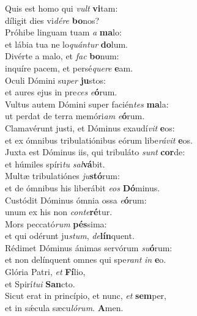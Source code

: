 \evenverse Quis est homo qui \textit{vult} \textbf{vi}tam:~\*\\
\evenverse díligit dies vi\textit{dé}\textit{re} \textbf{bo}nos?\\
\oddverse Próhibe linguam tuam \textit{a} \textbf{ma}lo:~\*\\
\oddverse et lábia tua ne lo\textit{quán}\textit{tur} \textbf{do}lum.\\
\evenverse Divérte a malo, et \textit{fac} \textbf{bo}num:~\*\\
\evenverse inquíre pacem, et persé\textit{que}\textit{re} \textbf{e}am.\\
\oddverse Oculi Dómini su\textit{per} \textbf{ju}stos:~\*\\
\oddverse et aures ejus in pre\textit{ces} \textit{e}\textbf{ó}rum.\\
\evenverse Vultus autem Dómini super facién\textit{tes} \textbf{ma}la:~\*\\
\evenverse ut perdat de terra memóri\textit{am} \textit{e}\textbf{ó}rum.\\
\oddverse Clamavérunt justi, et Dóminus exaudí\textit{vit} \textbf{e}os:~\*\\
\oddverse et ex ómnibus tribulatiónibus eórum libe\textit{rá}\textit{vit} \textbf{e}os.\\
\evenverse Juxta est Dóminus iis, qui tribuláto \textit{sunt} \textbf{cor}de:~\*\\
\evenverse et húmiles spíri\textit{tu} \textit{sal}\textbf{vá}bit.\\
\oddverse Multæ tribulatiónes \textit{ju}\textbf{stó}rum:~\*\\
\oddverse et de ómnibus his liberábit \textit{e}\textit{os} \textbf{Dó}minus.\\
\evenverse Custódit Dóminus ómnia ossa \textit{e}\textbf{ó}rum:~\*\\
\evenverse unum ex his non \textit{con}\textit{te}\textbf{ré}tur.\\
\oddverse Mors peccató\textit{rum} \textbf{pés}sima:~\*\\
\oddverse et qui odérunt ju\textit{stum}, \textit{de}\textbf{lín}quent.\\
\evenverse Rédimet Dóminus ánimas servórum \textit{su}\textbf{ó}rum:~\*\\
\evenverse et non delínquent omnes qui spe\textit{rant} \textit{in} \textbf{e}o.\\
\oddverse Glória Patri, \textit{et} \textbf{Fí}lio,~\*\\
\oddverse et Spirí\textit{tu}\textit{i} \textbf{San}cto.\\
\evenverse Sicut erat in princípio, et nunc, \textit{et} \textbf{sem}per,~\*\\
\evenverse et in sǽcula sæcu\textit{ló}\textit{rum}. \textbf{A}men.\\
